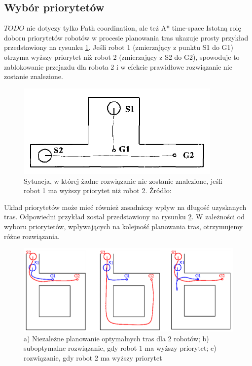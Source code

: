 \subsection{Wybór priorytetów}
$TODO$ nie dotyczy tylko Path coordination, ale też A* time-space
Istotną rolę doboru priorytetów robotów w procesie planowania tras ukazuje prosty przykład przedstawiony na rysunku \ref{fig:image_article1_fig1}. Jeśli robot 1 (zmierzający z punktu S1 do G1) otrzyma wyższy priorytet niż robot 2 (zmierzający z S2 do G2), spowoduje to zablokowanie przejazdu dla robota 2 i w efekcie prawidłowe rozwiązanie nie zostanie znalezione.
\begin{figure}[H]
	\centering
	\includegraphics[width=10cm]{img/article1/fig1}
	\caption{Sytuacja, w której żadne rozwiązanie nie zostanie znalezione, jeśli robot 1 ma wyższy priorytet niż robot 2. Źródło: \cite{optpriorities}}
	\label{fig:image_article1_fig1}
\end{figure}

Układ priorytetów może mieć również zasadniczy wpływ na długość uzyskanych tras. Odpowiedni przykład został przedstawiony na rysunku \ref{fig:image_article1_ppt6}. W zależności od wyboru priorytetów, wpływających na kolejność planowania tras, otrzymujemy różne rozwiązania.
\begin{figure}[H]
	\centering
	\includegraphics[width=13cm]{img/article1/ppt6}
	\caption{a) Niezależne planowanie optymalnych tras dla 2 robotów; b) suboptymalne rozwiązanie, gdy robot 1 ma wyższy priorytet; c) rozwiązanie, gdy robot 2 ma wyższy priorytet}
	\label{fig:image_article1_ppt6}
\end{figure}
